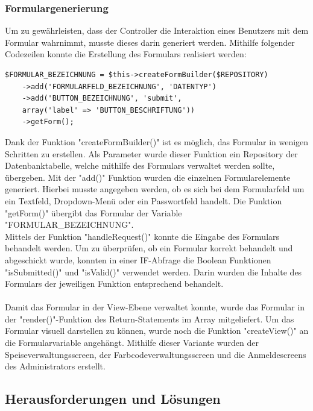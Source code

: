     \subsubsection{Formulargenerierung}

Um zu gewährleisten, dass der Controller die Interaktion eines Benutzers mit dem Formular wahrnimmt, musste dieses darin generiert werden. Mithilfe folgender Codezeilen konnte die Erstellung des Formulars realisiert werden:
	\lstset{language=php}
  	\begin{lstlisting}
$FORMULAR_BEZEICHNUNG = $this->createFormBuilder($REPOSITORY)
	->add('FORMULARFELD_BEZEICHNUNG', 'DATENTYP')
	->add('BUTTON_BEZEICHNUNG', 'submit', 
	array('label' => 'BUTTON_BESCHRIFTUNG'))
    ->getForm();
  	\end{lstlisting}
Dank der Funktion "createFormBuilder()" ist es möglich, das Formular in wenigen Schritten zu erstellen. Als Parameter wurde dieser Funktion ein Repository der Datenbanktabelle, welche mithilfe des Formulars verwaltet werden sollte, übergeben. Mit der "add()" Funktion wurden die einzelnen Formularelemente generiert. Hierbei musste angegeben werden, ob es sich bei dem Formularfeld um ein Textfeld, Dropdown-Menü oder ein Passwortfeld handelt. Die Funktion "getForm()" übergibt das Formular der Variable "FORMULAR\_BEZEICHNUNG".
\\
Mittels der Funktion "handleRequest()" konnte die Eingabe des Formulars behandelt werden. Um zu überprüfen, ob ein Formular korrekt behandelt und abgeschickt wurde, konnten in einer IF-Abfrage die Boolean Funktionen "isSubmitted()" und "isValid()" verwendet werden.
Darin wurden die Inhalte des Formulars der jeweiligen Funktion entsprechend behandelt.
\\ \\
Damit das Formular in der View-Ebene verwaltet konnte, wurde das Formular in der "render()"-Funktion des Return-Statements im Array mitgeliefert.
Um das Formular visuell darstellen zu können, wurde noch die Funktion "createView()" an die Formularvariable angehängt.
Mithilfe dieser Variante wurden der Speiseverwaltungsscreen, der Farbcodeverwaltungsscreen und die Anmeldescreens des Administrators erstellt.

  \subsection{Herausforderungen und Lösungen}

